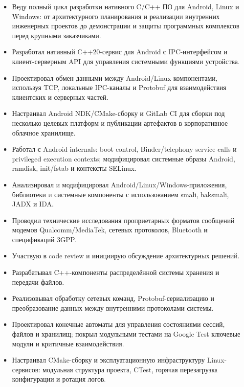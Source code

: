 \begin{itemize}
  \item Веду полный цикл разработки нативного C/C++ ПО для Android, Linux и Windows: от архитектурного планирования и реализации внутренних инженерных проектов до демонстрации и защиты программных комплексов перед крупными заказчиками.
  \item Разработал нативный C++20-сервис для Android с IPC-интерфейсом и клиент-серверным API для управления системными функциями устройства.
  \item Проектировал обмен данными между Android/Linux-компонентами, используя TCP, локальные IPC-каналы и Protobuf для взаимодействия клиентских и серверных частей.
  \item Настраивал Android NDK/CMake-сборку и GitLab CI для сборки под несколько целевых платформ и публикации артефактов в корпоративное облачное хранилище.
  \item Работал с Android internals: boot control, Binder/telephony service calls и privileged execution contexts; модифицировал системные образы Android, ramdisk, init/fstab и контексты SELinux.
  \item Анализировал и модифицировал Android/Linux/Windows-приложения, библиотеки и системные компоненты с использованием smali, baksmali, JADX и IDA.
  \item Проводил технические исследования проприетарных форматов сообщений модемов Qualcomm/MediaTek, сетевых протоколов, Bluetooth и спецификаций 3GPP.
  \item Участвую в code review и инициирую обсуждение архитектурных решений.
\end{itemize}

\begin{itemize}
  \item Разрабатывал C++-компоненты распределённой системы хранения и передачи файлов.
  \item Реализовывал обработку сетевых команд, Protobuf-сериализацию и преобразование данных между внутренними протоколами системы.
  \item Проектировал конечные автоматы для управления состояниями сессий, файлов и хранилищ; покрыл модульными тестами на Google Test ключевые модули и критичные взаимодействия.
  \item Настраивал CMake-сборку и эксплуатационную инфраструктуру Linux-сервисов: модульная структура проекта, CTest, горячая перезагрузка конфигурации и ротация логов.
\end{itemize}

